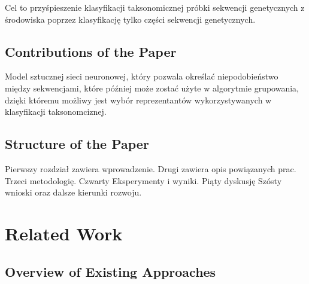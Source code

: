 \documentclass{article}
\newcommand{\temporary}[1]{
    \begin{tcolorbox}[colframe=red, colback=white, title={\textbf{WERSJA PO POLSKU}}, sharp corners=south]
        #1
    \end{tcolorbox}
}
\begin{document}
            \temporary{
                Cel to przyśpieszenie klasyfikacji taksonomicznej próbki sekwencji genetycznych z środowiska poprzez klasyfikację tylko części sekwencji genetycznych.
            }

        \subsection{Contributions of the Paper}

            \temporary{
                Model sztucznej sieci neuronowej, który pozwala określać niepodobieństwo między sekwencjami, które później może zostać użyte w algorytmie grupowania, dzięki któremu możliwy jest wybór reprezentantów wykorzystywanych w klasyfikacji taksonomciznej.
            }
        
        \subsection{Structure of the Paper}

            \temporary{
                Pierwszy rozdział zawiera wprowadzenie.
                Drugi zawiera opis powiązanych prac.
                Trzeci metodologię.
                Czwarty Eksperymenty i wyniki.
                Piąty dyskusję
                Szósty wnioski oraz dalsze kierunki rozwoju.
            }

    \section{Related Work}

        \subsection{Overview of Existing Approaches}
\end{document}
